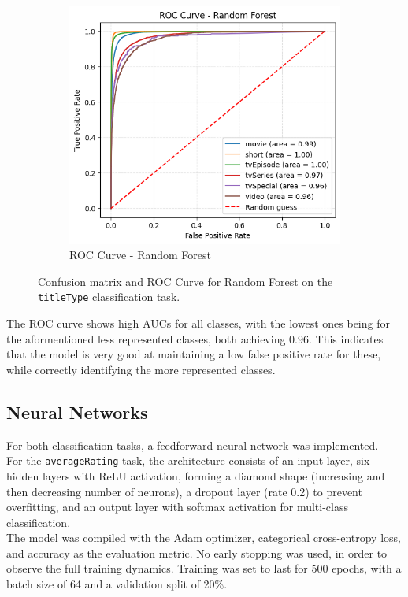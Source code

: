 \begin{figure}[H]
\begin{subfigure}[b]{0.50\textwidth}
        \includegraphics[width=\textwidth]{plotsss/roc_rf_titletype}
        \caption{ROC Curve - Random Forest}
        \label{fig:roc_rf}
    \end{subfigure}
    \caption{Confusion matrix and ROC Curve for Random Forest on the \texttt{titleType} classification task.}
    \label{fig:cm_comparison}
\end{figure}

The ROC curve shows high AUCs for all classes, with the lowest ones
being for the aformentioned less represented classes, both
achieving 0.96. This indicates that the model is very good at
maintaining a low false positive rate for these, while
correctly identifying the more represented classes.


\subsection{Neural Networks}

For both classification tasks, a feedforward neural network was
implemented.\\

For the \texttt{averageRating} task, the architecture consists of
an input layer, six hidden layers with ReLU activation, forming a
diamond shape (increasing and then decreasing number of neurons),
a dropout layer (rate 0.2) to prevent overfitting, and an output
layer with softmax activation for multi-class classification.\\
The model was compiled with the Adam optimizer, categorical
cross-entropy loss, and accuracy as the evaluation metric.
No early stopping was used, in order to observe the full
training dynamics. Training was set to last for 500 epochs, with a
batch size of 64 and a validation split of 20\%.


